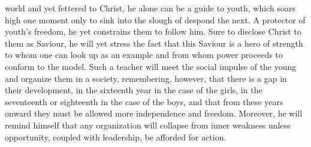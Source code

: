 world and yet fettered to Christ, he alone can be a guide to youth, which soars high one moment only to sink into the slough of despond the next. A protector of youth’s freedom, he yet constrains them to follow him. Sure to disclose Christ to them as Saviour, he will yet stress the fact that this Saviour is a hero of strength to whom one can look up as an example and from whom power proceeds to conform to the model. Such a teacher will meet the social impulse of the young and organize them in a society, remembering, however, that there is a gap in their development, in the sixteenth year in the case of the girls, in the seventeenth or eighteenth in the case of the boys, and that from these years onward they must be allowed more independence and freedom. Moreover, he will remind himself that any organization will collapse from inner weakness unless opportunity, coupled with leadership, be afforded for action.
